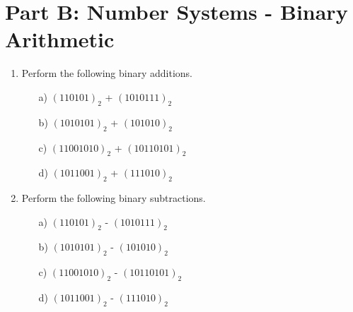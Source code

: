 \documentclass[12pt]{article}
\begin{document}
\section*{Part B: Number Systems - Binary Arithmetic}
\begin{enumerate}
	\item Perform the following binary additions.
	\begin{multicols}{2}
		\begin{itemize}
			\item[a)] $(110101)_{2}$ + $(1010111)_{2}$
			\item[b)] $(1010101)_{2}$ + $(101010)_{2}$
			\item[c)] $(11001010)_{2}$ + $(10110101)_{2}$
			\item[d)] $(1011001)_{2}$ + $(111010)_{2}$
		\end{itemize}
	\end{multicols}
	
	\item Perform the following binary subtractions.
	\begin{multicols}{2}
		\begin{itemize}
			\item[a)] $(110101)_{2}$ - $(1010111)_{2}$
			\item[b)] $(1010101)_{2}$ - $(101010)_{2}$
			\item[c)] $(11001010)_{2}$ - $(10110101)_{2}$
			\item[d)] $(1011001)_{2}$ - $(111010)_{2}$
		\end{itemize}
	\end{multicols}
\end{enumerate}
\end{document}
